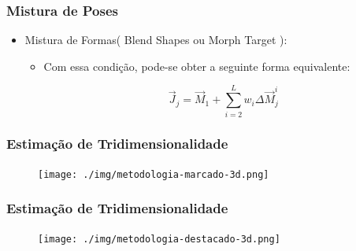 \documentclass[brazil]{beamer}
\begin{document}
\begin{frame}
\frametitle{Mistura de Poses}
  \begin{itemize}
  	
  	\item Mistura de Formas( Blend Shapes ou Morph Target ):
  	
  	
 	 	\begin{itemize}
          \item Com essa condição, pode-se obter a seguinte forma equivalente:
      
          \begin{equation}
            \vec{J}_j = \vec{M}_1 + \sum_{i = 2}^L w_i \Delta \vec{M}_j^i 
          \end{equation}

    \end{itemize} 

  \end{itemize} 
\end{frame}

\begin{frame}
\frametitle{Estimação de Tridimensionalidade}
        \begin{figure}
            \centering
            \texttt{[image: ./img/metodologia-marcado-3d.png]}
      \end{figure}
\end{frame}

\begin{frame}
\frametitle{Estimação de Tridimensionalidade}      

 \begin{figure}
            \centering
            \texttt{[image: ./img/metodologia-destacado-3d.png]}
      \end{figure}
\end{frame}
\end{document}
